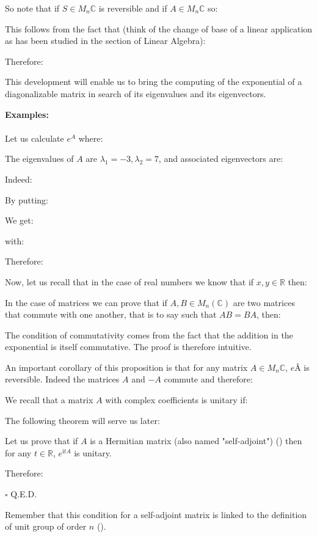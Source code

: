 	So note that if $S\in M_n\mathbb{C}$ is reversible and if $A\in M_n\mathbb{C}$  so:
	
	This follows from the fact that (think of the change of base of a linear application as has been studied in the section of Linear Algebra):
	
	Therefore:
	
	This development will enable us to bring the computing of the exponential of a diagonalizable matrix in search of its eigenvalues and its eigenvectors.
	\begin{tcolorbox}[colframe=black,colback=white,sharp corners]
	\textbf{{\Large {}}Examples:}\\\\
	Let us calculate $e^A$ where:
	
	The eigenvalues of $A$ are $\lambda_1=-3,\lambda_2=7$, and associated eigenvectors are:
	
	Indeed:
	
	By putting:
	
	We get:
	
	with:
	
	Therefore:
	
	\end{tcolorbox}
	Now, let us recall that in the case of real numbers we know that if $x,y\in \mathbb{R}$ then:
	
	In the case of matrices we can prove that if $A,B\in M_n(\mathbb{C})$ are two matrices that commute with one another, that is to say such that $AB=BA$, then:
	
	The condition of commutativity comes from the fact that the addition in the exponential is itself commutative. The proof is therefore intuitive.
	
	An important corollary of this proposition is that for any matrix $A\in M_n\mathbb{C}$, $eÂ$ is reversible. Indeed the matrices $A$ and $-A$ commute and therefore:
	
	We recall that a matrix $A$ with complex coefficients is unitary if:
	
	The following theorem will serve us later:
	\begin{theorem}
	Let us prove that if $A$ is a Hermitian matrix (also named "self-adjoint") () then for any $t\in\mathbb{R}$, $e^{\mathrm{i}tA}$ is unitary.
	\end{theorem}
	\begin{dem}
	
	Therefore:
	
	\begin{flushright}
		$\square$  Q.E.D.
	\end{flushright}
	\end{dem}
	Remember that this condition for a self-adjoint matrix is linked to the definition of unit group of order $n$ ().
	
